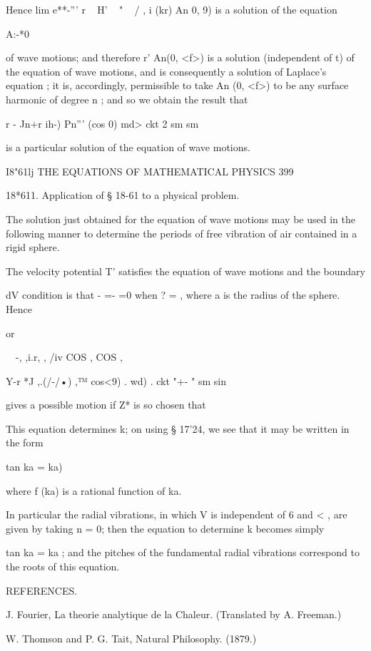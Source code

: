 Hence lim e**-''' r ~ H' ~ " ~   /  , i (kr) An  0, 9) is a solution of the equation 

A:-*0   

of wave motions; and therefore r' An(0, <f>) is a solution (independent of t) 
of the equation of wave motions, and is consequently a solution of Laplace's 
equation ; it is, accordingly, permissible to take An (0, <f>) to be any surface 
harmonic of degree n ; and so we obtain the result that 



r -   Jn+r ih-) Pn''' (cos 0)   md>   ckt 
 2   sm   sm 

is a particular solution of the equation of wave motions. 



I8"61lj THE EQUATIONS OF MATHEMATICAL PHYSICS 399 

18*611. Application of § 18-61 to a physical problem. 

The solution just obtained for the equation of wave motions may be used in the 
following manner to determine the periods of free vibration of air contained in a rigid 
sphere. 

The velocity potential T' satisfies the equation of wave motions and the boundary 

dV 
condition is that - =- =0 when ?  =  , where a is the radius of the sphere. Hence 

or   

~\ -, ,i.r, , /iv COS , COS , 

Y-r *J  ,.(/-/•)  ,™ cos<9) . wd) . ckt 
"+-   " sm   sin 

gives a possible motion if Z* is so chosen that 

This equation determines k; on using § 17'24, we see that it may be written in 
the form 

tan ka =    ka)  

where f  (ka) is a rational function of ka. 

In particular the radial vibrations, in which V is independent of 6 and < , are given by 
taking n = 0; then the equation to determine k becomes simply 

tan ka = ka ; 
and the pitches of the fundamental radial vibrations correspond to the roots of this 
equation. 

REFERENCES. 

J. Fourier, La theorie analytique de la Chaleur. (Translated by A. Freeman.) 

W. Thomson and P. G. Tait, Natural Philosophy. (1879.) 

